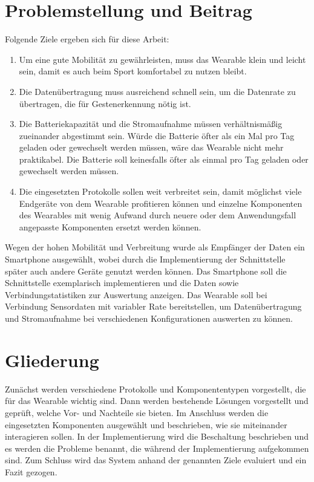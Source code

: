 \section{Problemstellung und Beitrag}
\label{ch:aims}
Folgende Ziele ergeben sich für diese Arbeit:
\begin{enumerate}
	\item Um eine gute Mobilität zu gewährleisten, muss das Wearable klein und leicht sein, damit es auch beim Sport komfortabel zu nutzen bleibt.
	\item Die Datenübertragung muss ausreichend schnell sein, um die Datenrate zu übertragen, die für Gestenerkennung nötig ist.
	\item Die Batteriekapazität und die Stromaufnahme müssen verhältnismäßig zueinander abgestimmt sein.
	Würde die Batterie öfter als ein Mal pro Tag geladen oder gewechselt werden müssen, wäre das Wearable nicht mehr praktikabel.
	Die Batterie soll keinesfalls öfter als einmal pro Tag geladen oder gewechselt werden müssen.
	\item Die eingesetzten Protokolle sollen weit verbreitet sein, damit möglichst viele Endgeräte von dem Wearable profitieren können und einzelne Komponenten des Wearables mit wenig Aufwand durch neuere oder dem Anwendungsfall angepasste Komponenten ersetzt werden können.
\end{enumerate}
Wegen der hohen Mobilität und Verbreitung wurde als Empfänger der Daten ein Smartphone ausgewählt, wobei durch die Implementierung der Schnittstelle später auch andere Geräte genutzt werden können.
Das Smartphone soll die Schnittstelle exemplarisch implementieren und die Daten sowie Verbindungstatistiken zur Auswertung anzeigen.
Das Wearable soll bei Verbindung Sensordaten mit variabler Rate bereitstellen, um Datenübertragung und Stromaufnahme bei verschiedenen Konfigurationen auswerten zu können.

\section{Gliederung}
Zunächst werden verschiedene Protokolle und Komponententypen vorgestellt, die für das Wearable wichtig sind.
Dann werden bestehende Lösungen vorgestellt und geprüft, welche Vor- und Nachteile sie bieten.
Im Anschluss werden die eingesetzten Komponenten ausgewählt und beschrieben, wie sie miteinander interagieren sollen.
In der Implementierung wird die Beschaltung beschrieben und es werden die Probleme benannt, die während der Implementierung aufgekommen sind.
Zum Schluss wird das System anhand der genannten Ziele evaluiert und ein Fazit gezogen.
